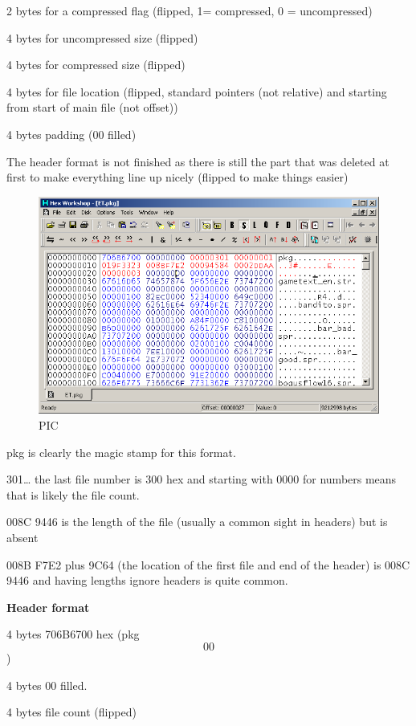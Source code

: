 \documentclass[
]{book}
\begin{document}
2 bytes for a compressed flag (flipped, 1= compressed, 0 = uncompressed)

4 bytes for uncompressed size (flipped)

4 bytes for compressed size (flipped)

4 bytes for file location (flipped, standard pointers (not relative) and starting from start of main file (not offset))

4 bytes padding (00 filled)

The header format is not finished as there is still the part that was deleted at first to make everything line up nicely (flipped to make things easier)

\begin{figure}
\centering
\includegraphics{images/131_home_fast6191_romhackingguide_unrenamed_fil___al_borders_romhackingguidearchive_eltigre_5.png}
\caption{PIC}
\end{figure}

pkg is clearly the magic stamp for this format.

301\ldots{} the last file number is 300 hex and starting with 0000 for numbers means that is likely the file count.

008C 9446 is the length of the file (usually a common sight in headers) but is absent

008B F7E2 plus 9C64 (the location of the first file and end of the header) is 008C 9446 and having lengths ignore headers is quite common.

\textbf{Header format}

4 bytes 706B6700 hex (pkg\[00\])

4 bytes 00 filled.

4 bytes file count (flipped)
\end{document}
